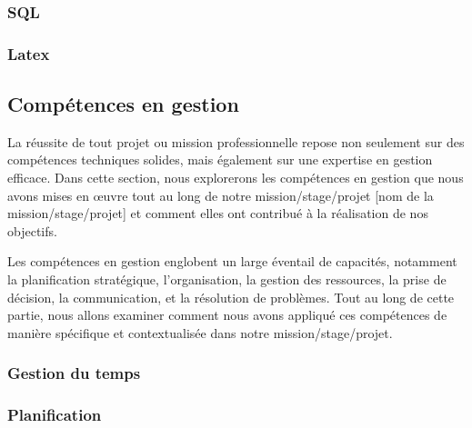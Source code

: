\documentclass[a4paper, 12pt, french]{article}
\begin{document}
				\subsubsection{SQL}
				
				\subsubsection{Latex}
				
				\subsubsection{}
				\subsubsection{}
			
			
			\subsection{Compétences en gestion}
				La réussite de tout projet ou mission professionnelle repose non seulement sur des compétences techniques solides, mais également sur une expertise en gestion efficace. Dans cette section, nous explorerons les compétences en gestion que nous avons mises en œuvre tout au long de notre mission/stage/projet [nom de la mission/stage/projet] et comment elles ont contribué à la réalisation de nos objectifs.

Les compétences en gestion englobent un large éventail de capacités, notamment la planification stratégique, l'organisation, la gestion des ressources, la prise de décision, la communication, et la résolution de problèmes. Tout au long de cette partie, nous allons examiner comment nous avons appliqué ces compétences de manière spécifique et contextualisée dans notre mission/stage/projet.
				
				\subsubsection{Gestion du temps}

				\subsubsection{Planification}
			
\end{document}
